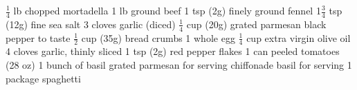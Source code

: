 \dishtype{\main}
\dishother{}
\begin{ingreds}
    \ingredients[Meatballs]
        $\frac{1}{4}$ lb chopped mortadella
        1 lb ground beef
        1 tsp (2g) finely ground fennel
        1$\frac{3}{4}$ tsp (12g) fine sea salt
        3 cloves garlic (diced)
        $\frac{1}{4}$ cup (20g) grated parmesan
        black pepper to taste
        $\frac{1}{2}$ cup (35g) bread crumbs
        1 whole egg
    \columnbreak{}
    \ingredients[Sauce]
        $\frac{1}{4}$ cup extra virgin olive oil
        4 cloves garlic, thinly sliced
        1 tsp (2g) red pepper flakes
        1 can peeled tomatoes (28 oz)
        1 bunch of basil
        grated parmesan for serving
        chiffonade basil for serving
        1 package spaghetti
    
\end{ingreds}
